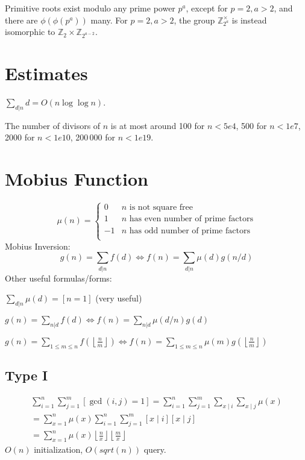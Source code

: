 	Primitive roots exist modulo any prime power $p^a$, except for $p = 2, a > 2$, and there are $\phi(\phi(p^a))$ many.
	For $p = 2, a > 2$, the group $\mathbb Z_{2^a}^\times$ is instead isomorphic to $\mathbb Z_2 \times \mathbb Z_{2^{a-2}}$.

\section{Estimates}
	$\sum_{d|n} d = O(n \log \log n)$.

	The number of divisors of $n$ is at most around 100 for $n < 5e4$, 500 for $n < 1e7$, 2000 for $n < 1e10$, 200\,000 for $n < 1e19$.

\section{Mobius Function}
\[
	\mu(n) = \begin{cases} 0 & n \textrm{ is not square free}\\ 1 & n \textrm{ has even number of prime factors}\\ -1 & n \textrm{ has odd number of prime factors}\\\end{cases}
\]
  Mobius Inversion:
  \[ g(n) = \sum_{d|n} f(d) \Leftrightarrow f(n) = \sum_{d|n} \mu(d)g(n/d) \]
  Other useful formulas/forms:

  $ \sum_{d | n} \mu(d) = [ n = 1] $ (very useful)

  $ g(n) = \sum_{n|d} f(d) \Leftrightarrow f(n) = \sum_{n|d} \mu(d/n)g(d)$

 $ g(n) = \sum_{1 \leq m \leq n} f(\left\lfloor\frac{n}{m}\right \rfloor ) \Leftrightarrow f(n) = \sum_{1\leq m\leq n} \mu(m)g(\left\lfloor\frac{n}{m}\right\rfloor)$

 \subsection{Type I}
 \begin{equation}
	\begin{gathered}
	\sum_{i=1}^n \sum_{j=1}^m[\operatorname{gcd}(i, j)=1]=\sum_{i=1}^n \sum_{j=1}^m \sum_{x \mid i} \sum_{x \mid j} \mu(x) \\
	=\sum_{x=1}^n \mu(x) \sum_{i=1}^n \sum_{j=1}^m[x \mid i][x \mid j] \\
	=\sum_{x=1}^n \mu(x)\left\lfloor\frac{n}{x}\right\rfloor\left\lfloor\frac{m}{x}\right\rfloor
	\end{gathered}
	\end{equation}
$O(n)$ initialization, $O(sqrt(n))$ query.

